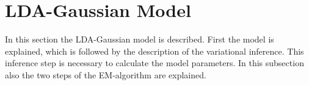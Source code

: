 % 
%  
% 
% 

\section{LDA-Gaussian Model}
In this section the LDA-Gaussian model is described. First the model is explained, which is followed by the description of the variational inference. This inference step is necessary to calculate the model parameters. In this subsection also the two steps of the EM-algorithm are explained.



